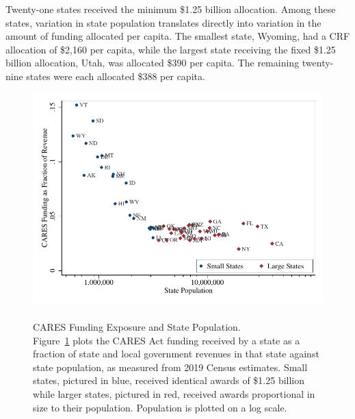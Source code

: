 Twenty-one states received the minimum \$1.25 billion allocation. Among these states, variation in state population translates directly into variation in the amount of funding allocated per capita. The smallest state, Wyoming, had a CRF allocation of \$2,160 per capita, while the largest state receiving the fixed \$1.25 billion allocation, Utah, was allocated \$390 per capita. The remaining twenty-nine states were each allocated \$388 per capita.  

\begin{singlespace}
\begin{center}
\begin{figure}[ht!]
	\centering
	\includegraphics[scale=1.1]{../output/figures/cares_logpop_fs.pdf}
	\vspace{-1.2cm}
	\caption{\\ CARES Funding Exposure and State Population. \\
	{\small Figure~\ref{figure:cares_frac_rev_sl} plots the CARES Act funding received by a state as a fraction of state and local government revenues in that state against state population, as measured from 2019 Census estimates. Small states, pictured in blue, received identical awards of \$1.25 billion while larger states, pictured in red, received awards proportional in size to their population. Population is plotted on a log scale.}}
	\label{figure:cares_frac_rev_sl}
\end{figure}
\end{center}
\end{singlespace}

